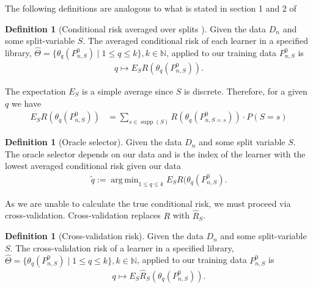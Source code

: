 \documentclass[11pt, a4paper]{article}
\DeclareMathOperator*{\argmin}{arg\,min}
\theoremstyle{definition}
\newtheorem{definition}[theorem]{Definition}
\theoremstyle{remark}
\newcommand{\q}{q}
\newcommand{\ml}{k}
\newcommand{\btheta}{\theta}
\begin{document}
 The following definitions are analogous to what is stated in section 1 and 2 of  \cite{laan03}
 \begin{definition}[Conditional risk averaged over splits \cite{vaart06}]
    Given the data $ D_n $ and some split-variable $ S $. The averaged conditional risk of each learner in a specified library, $ \hat{\Theta} = \{ \btheta_{\q}(P_{n, S}^{0}) \mid 1 \leq \q \leq \ml \}, \ml \in \mathbb{N} $, applied to our training data $ P_{n, S}^{0} $ is 
    \begin{align*}
        \q \mapsto E_S R( \btheta_\q(P_{n,S}^{0})).
    \end{align*}
\end{definition}
The expectation $ E_S $ is a simple average since $ S $ is discrete. Therefore, for a given $ \q $ we have 
\begin{align*}
    E_S R( \btheta_\q(P_{n,S}^{0})) &= \sum_{s \in \operatorname{supp}(S)} R(\theta_{q}(P_{n, S = s}^{0})) \cdot P(S = s) 
\end{align*}



\begin{definition}[Oracle selector]
    Given the data $ D_n $ and some split variable $ S $. The oracle selector depends on our data and is the index of the learner with the lowest averaged conditional risk given our data 
    \begin{align*}
        \tilde{\q} := \argmin_{1 \leq \q \leq \ml} E_S R( \btheta _\q (P_{n,S}^0 ) .
    \end{align*}
\end{definition}
As we are unable to calculate the true conditional risk, we must proceed via cross-validation. Cross-validation replaces $ R $ with $ \hat{R}_{S} $.
\begin{definition}[Cross-validation risk]
    Given the data $ D_n $ and some split-variable $ S $. The cross-validation risk of a learner in a specified library, $ \hat{\Theta} = \{ \btheta_{\q}(P_{n, S}^{0}) \mid 1 \leq \q \leq \ml \}, \ml \in \mathbb{N} $, applied to our training data $ P_{n, S}^{0} $ is  
    \begin{align*}
        \q \mapsto E_S \hat{R}_S( \btheta_\q(P_{n,S}^{0})).
    \end{align*}
\end{definition}
\end{document}
